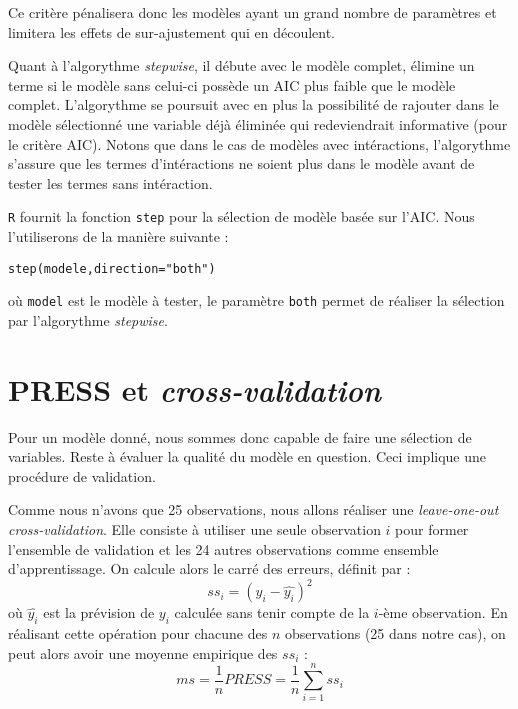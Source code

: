Ce critère pénalisera donc les modèles ayant un grand nombre de paramètres et limitera les effets de sur-ajustement qui en découlent. 

Quant à l'algorythme \emph{stepwise}, il débute avec le modèle complet, élimine un terme si le modèle sans celui-ci possède un AIC plus faible que le modèle complet. L'algorythme se poursuit avec en plus la possibilité de rajouter dans le modèle sélectionné une variable déjà éliminée qui redeviendrait informative (pour le critère AIC).  
Notons que dans le cas de modèles avec intéractions, l'algorythme s'assure que les termes d'intéractions ne soient plus dans le modèle avant de tester les termes sans intéraction. 


\verb|R| fournit la fonction \verb|step| pour la sélection de modèle basée sur l'AIC. Nous l'utiliserons de la manière suivante : 
\begin{center}
\verb|step(modele,direction="both")|
\end{center}
où \verb|model| est le modèle à tester, le paramètre \verb|both| permet de réaliser la sélection par l'algorythme \emph{stepwise}. 


\section{PRESS et \emph{cross-validation}}

Pour un modèle donné, nous sommes donc capable de faire une sélection de variables. Reste à évaluer la qualité du modèle en question. Ceci implique une procédure de validation. 

Comme nous n'avons que 25 observations, nous allons réaliser une \emph{leave-one-out cross-validation}. Elle consiste à utiliser une seule observation $i$ pour former l'ensemble de validation et les 24 autres observations comme ensemble d'apprentissage. On calcule alors le carré des erreurs, définit par :   
\[ss_i=(y_i-\hat{y_i})^2\]
où $\hat{y_i}$ est la prévision de $y_i$ calculée sans tenir compte de la $i$-ème observation.
En réalisant cette opération pour chacune des $n$ observations (25 dans notre cas), on peut alors avoir une moyenne empirique des $ss_i$ :
\[ms = \frac{1}{n} PRESS = \frac{1}{n}\sum_{i=1}^{n}{ss_i}\]

